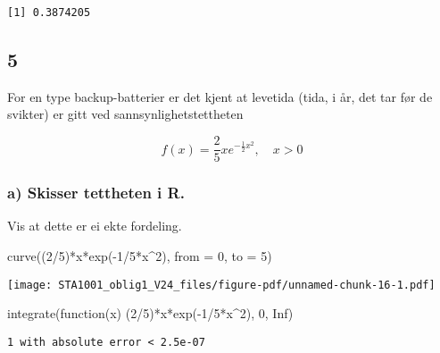 \documentclass[
  12pt,
  a4paper,
  DIV=11,
  numbers=noendperiod]{scrartcl}
\newenvironment{Shaded}{\begin{snugshade}}{\end{snugshade}}
\newcommand{\AttributeTok}[1]{\textcolor[rgb]{0.40,0.45,0.13}{#1}}
\newcommand{\ConstantTok}[1]{\textcolor[rgb]{0.56,0.35,0.01}{#1}}
\newcommand{\ControlFlowTok}[1]{\textcolor[rgb]{0.00,0.23,0.31}{#1}}
\newcommand{\DecValTok}[1]{\textcolor[rgb]{0.68,0.00,0.00}{#1}}
\newcommand{\FunctionTok}[1]{\textcolor[rgb]{0.28,0.35,0.67}{#1}}
\newcommand{\NormalTok}[1]{\textcolor[rgb]{0.00,0.23,0.31}{#1}}
\newcommand{\SpecialCharTok}[1]{\textcolor[rgb]{0.37,0.37,0.37}{#1}}
\begin{document}
\begin{verbatim}
[1] 0.3874205
\end{verbatim}

\subsection{5}\label{section}

For en type backup-batterier er det kjent at levetida (tida, i år, det
tar før de svikter) er gitt ved sannsynlighetstettheten

\[
f(x) = \frac{2}{5} x e^{-\frac{1}{2}x^2}, \quad x > 0
\]

\subsubsection{a) Skisser tettheten i
R.}\label{a-skisser-tettheten-i-r.}

Vis at dette er ei ekte fordeling.

\begin{Shaded}
\begin{Highlighting}[]
\FunctionTok{curve}\NormalTok{((}\DecValTok{2}\SpecialCharTok{/}\DecValTok{5}\NormalTok{)}\SpecialCharTok{*}\NormalTok{x}\SpecialCharTok{*}\FunctionTok{exp}\NormalTok{(}\SpecialCharTok{{-}}\DecValTok{1}\SpecialCharTok{/}\DecValTok{5}\SpecialCharTok{*}\NormalTok{x}\SpecialCharTok{\^{}}\DecValTok{2}\NormalTok{), }\AttributeTok{from =} \DecValTok{0}\NormalTok{, }\AttributeTok{to =} \DecValTok{5}\NormalTok{)}
\end{Highlighting}
\end{Shaded}

\texttt{[image: STA1001\_oblig1\_V24\_files/figure-pdf/unnamed-chunk-16-1.pdf]}

\begin{Shaded}
\begin{Highlighting}[]
\FunctionTok{integrate}\NormalTok{(}\ControlFlowTok{function}\NormalTok{(x) (}\DecValTok{2}\SpecialCharTok{/}\DecValTok{5}\NormalTok{)}\SpecialCharTok{*}\NormalTok{x}\SpecialCharTok{*}\FunctionTok{exp}\NormalTok{(}\SpecialCharTok{{-}}\DecValTok{1}\SpecialCharTok{/}\DecValTok{5}\SpecialCharTok{*}\NormalTok{x}\SpecialCharTok{\^{}}\DecValTok{2}\NormalTok{), }\DecValTok{0}\NormalTok{, }\ConstantTok{Inf}\NormalTok{)}
\end{Highlighting}
\end{Shaded}

\begin{verbatim}
1 with absolute error < 2.5e-07
\end{verbatim}
\end{document}
